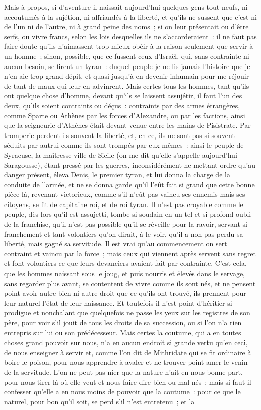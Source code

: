 \documentclass[french,twoside]{book} %
\begin{document}
Mais à propos, si d’aventure il naissait aujourd’hui quelques gens tout neufs, ni accoutumés à la sujétion, ni affriandés à la liberté, et qu’ils ne sussent que c’est ni de l’un ni de l’autre, ni à grand peine des noms ; si on leur présentait ou d’être serfs, ou vivre francs, selon les lois desquelles ils ne s’accorderaient : il ne faut pas faire doute qu’ils n’aimassent trop mieux obéir à la raison seulement que servir à un homme ; sinon, possible, que ce fussent ceux d’Israël, qui, sans contrainte ni aucun besoin, se firent un tyran : duquel peuple je ne lis jamais l’histoire que je n’en aie trop grand dépit, et quasi jusqu’à en devenir inhumain pour me réjouir de tant de maux qui leur en advinrent. Mais certes tous les hommes, tant qu’ils ont quelque chose d’homme, devant qu’ils se laissent assujétir, il faut l’un des deux, qu’ils soient contraints ou déçus : contraints par des armes étrangères, comme Sparte ou Athènes par les forces d’Alexandre, ou par les factions, ainsi que la seigneurie d’Athènes était devant venue entre les mains de Pisistrate. Par tromperie perdent-ils souvent la liberté, et, en ce, ils ne sont pas si souvent séduits par autrui comme ils sont trompés par eux-mêmes : ainsi le peuple de Syracuse, la maîtresse ville de Sicile (on me dit qu’elle s’appelle aujourd’hui Saragousse), étant pressé par les guerres, inconsidérément ne mettant ordre qu’au danger présent, éleva Denis, le premier tyran, et lui donna la charge de la conduite de l’armée, et ne se donna garde qu’il l’eût fait si grand que cette bonne pièce-là, revenant victorieux, comme s’il n’eût pas vaincu ses ennemis mais ses citoyens, se fit de capitaine roi, et de roi tyran. Il n’est pas croyable comme le peuple, dès lors qu’il est assujetti, tombe si soudain en un tel et si profond oubli de la franchise, qu’il n’est pas possible qu’il se réveille pour la ravoir, servant si franchement et tant volontiers qu’on dirait, à le voir, qu’il a non pas perdu sa liberté, mais gagné sa servitude. Il est vrai qu’au commencement on sert contraint et vaincu par la force ; mais ceux qui viennent après servent sans regret et font volontiers ce que leurs devanciers avaient fait par contrainte. C’est cela, que les hommes naissant sous le joug, et puis nourris et élevés dans le servage, sans regarder plus avant, se contentent de vivre comme ils sont nés, et ne pensent point avoir autre bien ni autre droit que ce qu’ils ont trouvé, ils prennent pour leur naturel l’état de leur naissance. Et toutefois il n’est point d’héritier si prodigue et nonchalant que quelquefois ne passe les yeux sur les registres de son père, pour voir s’il jouit de tous les droits de sa succession, ou si l’on n’a rien entrepris sur lui ou son prédécesseur. Mais certes la coutume, qui a en toutes choses grand pouvoir sur nous, n’a en aucun endroit si grande vertu qu’en ceci, de nous enseigner à servir et, comme l’on dit de Mithridate qui se fit ordinaire à boire le poison, pour nous apprendre à avaler et ne trouver point amer le venin de la servitude. L’on ne peut pas nier que la nature n’ait en nous bonne part, pour nous tirer là où elle veut et nous faire dire bien ou mal nés ; mais si faut il confesser qu’elle a en nous moins de pouvoir que la coutume : pour ce que le naturel, pour bon qu’il soit, se perd s’il n’est entretenu ; et la 
\end{document}
